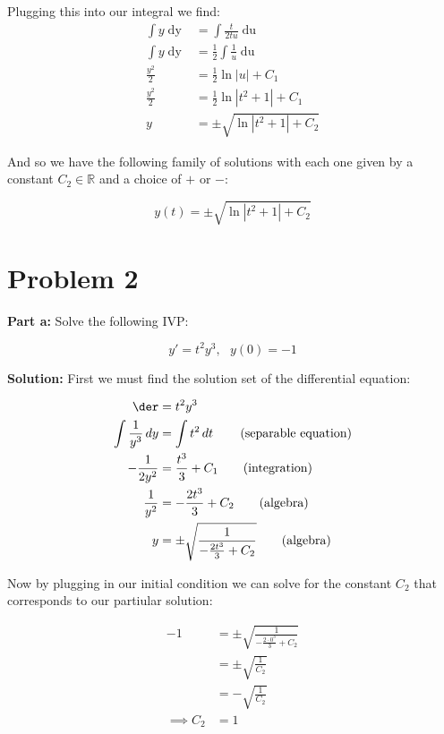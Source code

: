 \documentclass{article}
\begin{document}
Plugging this into our integral we find:
\begin{align*}
    \int y\mathop{dy}&=\int \frac{t}{2tu}\mathop{du}\tag{$u$-substitution}\\
    \int y\mathop{dy}&=\frac{1}{2}\int\frac{1}{u}\mathop{du}\tag{algebra}\\
    \frac{y^2}{2}&=\frac{1}{2}\ln{|u|}+C_1\tag{integration}\\
    \frac{y^2}{2}&=\frac{1}{2}\ln{|t^2+1|}+C_1\tag{$u$-substitution}\\
    y&=\pm\sqrt{\ln{|t^2+1|}+C_2}\tag{algebra}
\end{align*}

And so we have the following family of solutions with each one given by a constant $C_2\in\mathbb R$ and a choice of $+$ or $-$:

\begin{equation*}
    y(t)=\pm\sqrt{\ln{|t^2+1|}+C_2}
\end{equation*}

\section*{Problem 2}
\noindent\textbf{Part a:} Solve the following IVP:

\begin{equation*}
    y'=t^2y^3,\,\,\,\, y(0)=-1
\end{equation*}
\smallskip

\noindent\textbf{Solution:} First we must find the solution set of the differential equation:

\begin{align*}
    \der&=t^2y^3\\
    \int \frac{1}{y^3}\mathop{dy}&=\int t^2\mathop{dt}\tag{separable equation}\\
    -\frac{1}{2y^2}&=\frac{t^3}{3}+C_1\tag{integration}\\
    \frac{1}{y^2}&=-\frac{2t^3}{3}+C_2\tag{algebra}\\
    y&=\pm\sqrt{\frac{1}{-\frac{2t^3}{3}+C_2}}\tag{algebra}
\end{align*}

Now by plugging in our initial condition we can solve for the constant $C_2$ that corresponds to our partiular solution:

\begin{align*}
    -1&=\pm\sqrt{\frac{1}{-\frac{2\cdot0^3}{3}+C_2}}\tag{$(t,y)=(0,-1)$}\\
    &=\pm\sqrt{\frac{1}{C_2}}\\
    &=-\sqrt{\frac{1}{C_2}}\tag{$+$ case impossible}\\
    \implies C_2&=1
\end{align*}
\end{document}
